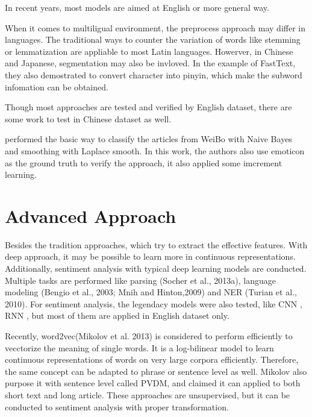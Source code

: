 In recent years, most models are aimed at English or more general way. 

When it comes to multiligual environment, the preprocess approach may differ in languages. The traditional ways to counter the variation of words like stemming or lemmatization are appliable to most Latin languages.
Howerver, in Chinese and Japanese, segmentation may also be invloved. In the example of FastText\cite{joulin2016fasttext}, they also demostrated to convert character into pinyin, which make the subword infomation can be obtained. 

Though most approaches are tested and verified by English dataset, there are some work to test in Chinese dataset as well.

\cite{zhao2012moodlens} performed the basic way to classify the articles from WeiBo with Naive Bayes and smoothing with Laplace smooth.  
In this work, the authors also use emoticon as the ground truth to verify the approach, it also applied some imcrement learning. \\


\section{Advanced Approach}

Besides the tradition approaches, which try to extract the effective features. With deep approach, it may be possible to learn more in  continuous representations.
Additionally, sentiment analysis with typical deep learning models are conducted. Multiple tasks are performed like  parsing (Socher et al., 2013a), language
modeling (Bengio et al., 2003; Mnih and Hinton,2009) and NER (Turian et al., 2010). For sentiment analysis, the legendacy models were also tested, like CNN \cite{kim2014convolutional}, RNN \cite{arevian2007recurrent}, but most of them are applied in English dataset only. 

Recently, word2vec(Mikolov et al. 2013)\cite{word2vec} is considered to perform efficiently to vecctorize the meaning of single words. It is a log-bilinear model to learn continuous
representations of words on very large corpora efficiently. Therefore, the same concept can be adapted to phrase or sentence level as well.
Mikolov also purpose it with sentence level \cite{PVDM} called PVDM, and claimed it can applied to both short text and long article. These approaches are unsupervised, but it can be conducted to sentiment analysis with proper transformation. 

